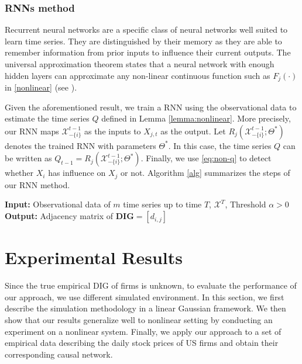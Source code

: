 \subsubsection{RNNs method}
 Recurrent neural networks are a specific class of neural networks well suited to learn time series. 
 They are distinguished by their memory as they are able to remember information from prior inputs to influence their current outputs.
 The universal approximation theorem states that a neural network with enough hidden layers can approximate any non-linear continuous function such as $F_j(\cdot)$ in \eqref{nonlinear} (see \citet{HORNIK1989359}). 
 
 Given the aforementioned result, we train a RNN using the observational data to estimate the time series $Q$ defined in Lemma \ref{lemma:nonlinear}.
 More precisely, our RNN maps $\mathcal{X}_{-\{i\}}^{t-1}$ as the inputs to $X_{j,t}$ as the output. 
 Let $R_j(\mathcal{X}_{-\{i\}}^{t-1};\Theta^*)$ denotes the trained RNN with parameters $\Theta^*$. 
 In this case, the time series $Q$ can be written as  $Q_{t-1}=R_{j}(\mathcal{X}_{-\{i\}}^{t-1};\Theta^*)$.
 Finally, we use \eqref{eq:non-q} to detect whether $X_i$ has influence on $X_j$ or not. 
 Algorithm \ref{alg}  summarizes the steps of our RNN method.

 \begin{algorithm}[h]
 \textbf{Input:} Observational data of $m$ time series up to time $T$, $\mathcal{X}^T$, Threshold $\alpha>0$\;
 \textbf{Output:} Adjacency matrix of $\textbf{DIG}=[d_{i,j}]$\;
 \label{alg}
\end{algorithm}


 
\section{Experimental Results}\label{sec:exp}

 Since the true empirical DIG of firms is unknown, to evaluate the performance of our approach, we use different simulated environment.
 In this section, we first describe the simulation methodology in a linear Gaussian framework. 
 We then show that our results generalize well to nonlinear setting by conducting an experiment on a nonlinear system. 
 Finally, we apply our approach to a set of empirical data describing the daily stock prices of US firms and obtain their corresponding causal network. 
 
